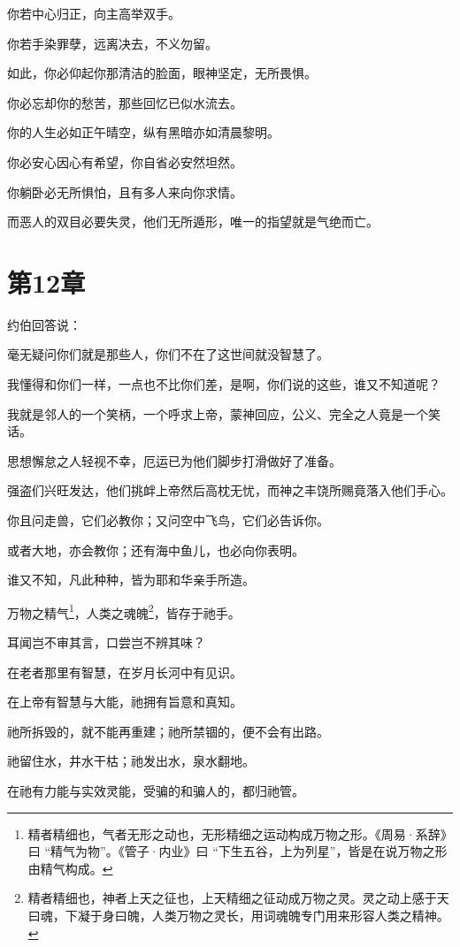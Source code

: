 \documentclass[12pt,oneside]{book}
\begin{document}
你若中心归正，向主高举双手。

你若手染罪孽，远离决去，不义勿留。

如此，你必仰起你那清洁的脸面，眼神坚定，无所畏惧。

你必忘却你的愁苦，那些回忆已似水流去。

你的人生必如正午晴空，纵有黑暗亦如清晨黎明。

你必安心因心有希望，你自省必安然坦然。

你躺卧必无所惧怕，且有多人来向你求情。

而恶人的双目必要失灵，他们无所遁形，唯一的指望就是气绝而亡。



\chapter{第12章}
约伯回答说：

毫无疑问你们就是那些人，你们不在了这世间就没智慧了。

我懂得和你们一样，一点也不比你们差，是啊，你们说的这些，谁又不知道呢？

我就是邻人的一个笑柄，一个呼求上帝，蒙神回应，公义、完全之人竟是一个笑话。

思想懈怠之人轻视不幸，厄运已为他们脚步打滑做好了准备。

强盗们兴旺发达，他们挑衅上帝然后高枕无忧，而神之丰饶所赐竟落入他们手心。

你且问走兽，它们必教你；又问空中飞鸟，它们必告诉你。

或者大地，亦会教你；还有海中鱼儿，也必向你表明。

谁又不知，凡此种种，皆为耶和华亲手所造。

万物之精气\footnote{精者精细也，气者无形之动也，无形精细之运动构成万物之形。《周易·系辞》曰 “精气为物”。《管子·内业》曰 “下生五谷，上为列星”，皆是在说万物之形由精气构成。}，人类之魂魄\footnote{精者精细也，神者上天之征也，上天精细之征动成万物之灵。灵之动上感于天曰魂，下凝于身曰魄，人类万物之灵长，用词魂魄专门用来形容人类之精神。}，皆存于祂手。

耳闻岂不审其言，口尝岂不辨其味？

在老者那里有智慧，在岁月长河中有见识。

在上帝有智慧与大能，祂拥有旨意和真知。

祂所拆毁的，就不能再重建；祂所禁锢的，便不会有出路。

祂留住水，井水干枯；祂发出水，泉水翻地。

在祂有力能与实效灵能，受骗的和骗人的，都归祂管。
\end{document}
